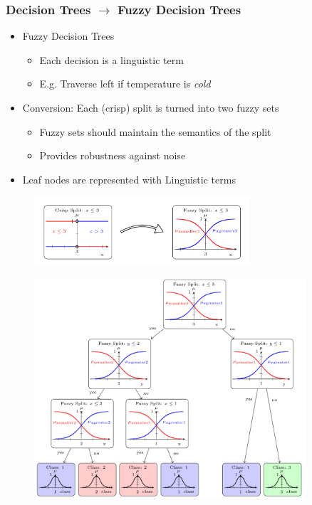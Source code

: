 \documentclass[
	10pt,
	t		%
]{beamer}
\begin{document}
\begin{frame}
	\frametitle{Decision Trees $\rightarrow$ Fuzzy Decision Trees}

	\begin{itemize}
		\item Fuzzy Decision Trees
		      \begin{itemize}
			      \item Each decision is a linguistic term
			      \item E.g. Traverse left if temperature is \textit{cold}
		      \end{itemize}
		\item Conversion: Each (crisp) split is turned into two fuzzy sets
		      \begin{itemize}
			      \item Fuzzy sets should maintain the semantics of the split
			      \item Provides robustness against noise
		      \end{itemize}
		\item Leaf nodes are represented with Linguistic terms
	\end{itemize}
	\begin{figure}
		\centering
		\includegraphics[width=8cm]{figures/leaf-conversion.png}
	\end{figure}

\end{frame}

\begin{frame}

	\begin{figure}
		\centering
		\includegraphics[width=0.9\textwidth]{figures/fuzzy-decision-tree.png}
	\end{figure}

\end{frame}
\end{document}
